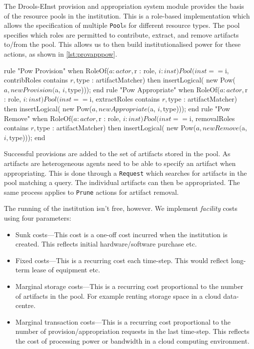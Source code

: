 The Drools-EInst provision and appropriation system module provides the basis
of the resource pools in the institution. This is a role-based implementation
which allows the specification of multiple \texttt{Pool}s for different
resource types. The pool specifies which roles are permitted to contribute,
extract, and remove artifacts to/from the pool. This allows us to then build
institutionalised power for these actions, as shown in \autoref{lst:provapppow}.

\begin{drools}[label=lst:provapppow,caption={Institutionalised power for provision, appropration and removal from a pool of artifacts.}]
rule "Pow Provision"
	when
		RoleOf($a : actor, $r : role, $i : inst)
		Pool(inst == $i, contribRoles contains $r, $type : artifactMatcher)
	then
		insertLogical( new Pow($a, new Provision($a, $i, $type)));
end
rule "Pow Appropriate"
	when
		RoleOf($a : actor, $r : role, $i : inst)
		Pool(inst == $i, extractRoles contains $r, $type : artifactMatcher)
	then
		insertLogical( new Pow($a, new Appropriate($a, $i, $type)));
end
rule "Pow Remove"
	when
		RoleOf($a : actor, $r : role, $i : inst)
		Pool(inst == $i, removalRoles contains $r, $type : artifactMatcher)
	then
		insertLogical( new Pow($a, new Remove($a, $i, $type)));
end
\end{drools}

Successful provisions are added to the set of artifacts stored in the pool. As
artifacts are heterogeneous agents need to be able to specify an artifact when
appropriating. This is done through a \texttt{Request} which searches for
artifacts in the pool matching a query. The individual artifacts can then be
appropriated. The same process applies to \texttt{Prune} actions for artifact
removal.

The running of the institution isn't free, however. We implement
\emph{facility} costs using four parameters:

\begin{itemize}
\item Sunk costs---This cost is a one-off cost incurred when the institution is created. This reflects initial hardware/software purchase etc.
\item Fixed costs---This is a recurring cost each time-step. This would reflect long-term lease of equipment etc.
\item Marginal storage costs---This is a recurring cost proportional to the number of artifacts in the pool. For example renting storage space in a cloud data-centre.
\item Marginal transaction costs---This is a recurring cost proportional to the number of provision/appropriation requests in the last time-step. This reflects the cost of processing power or bandwidth in a cloud computing environment.
\end{itemize}


